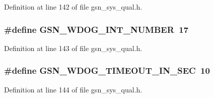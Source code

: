 Definition at line 142 of file gsn\_\-sys\_\-qual.h.

\hypertarget{a00593_a5b2d0d53bec6a4677fc2a92ceabebf3a}{
\subsubsection[{GSN\_\-WDOG\_\-INT\_\-NUMBER}]{\setlength{\rightskip}{0pt plus 5cm}\#define GSN\_\-WDOG\_\-INT\_\-NUMBER~17}}
\label{a00593_a5b2d0d53bec6a4677fc2a92ceabebf3a}


Definition at line 143 of file gsn\_\-sys\_\-qual.h.

\hypertarget{a00593_a834c876307d18c3a77fde059aaf17061}{
\subsubsection[{GSN\_\-WDOG\_\-TIMEOUT\_\-IN\_\-SEC}]{\setlength{\rightskip}{0pt plus 5cm}\#define GSN\_\-WDOG\_\-TIMEOUT\_\-IN\_\-SEC~10}}
\label{a00593_a834c876307d18c3a77fde059aaf17061}


Definition at line 144 of file gsn\_\-sys\_\-qual.h.

